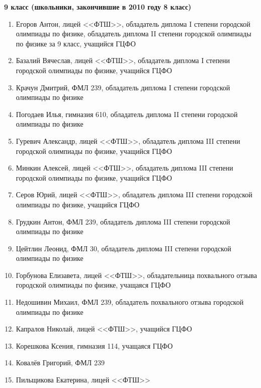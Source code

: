 \textbf{9 класс (школьники, закончившие в 2010 году 8 класс)}
\begin{enumerate}
\item Егоров Антон, лицей <<ФТШ>>, обладатель диплома I степени городской олимпиады по физике, обладатель диплома II степени городской олимпиады по физике за 9 класс, учащийся ГЦФО
\item Базалий Вячеслав, лицей <<ФТШ>>, обладатель диплома I степени городской олимпиады по физике, учащийся ГЦФО
\item Крачун Дмитрий, ФМЛ 239, обладатель диплома I степени городской олимпиады по физике
\item Погодаев Илья, гимназия 610, обладатель диплома II степени городской олимпиады по физике
\item Гуревич Александр, лицей <<ФТШ>>, обладатель диплома III степени городской олимпиады по физике, учащийся ГЦФО
\item Минкин Алексей, лицей <<ФТШ>>, обладатель диплома III степени городской олимпиады по физике, учащийся ГЦФО
\item Серов Юрий, лицей <<ФТШ>>, обладатель диплома III степени городской олимпиады по физике, учащийся ГЦФО
\item Грудкин Антон, ФМЛ 239, обладатель диплома III степени городской олимпиады по физике
\item Цейтлин Леонид, ФМЛ 30, обладатель диплома III степени городской олимпиады по физике
\item Горбунова Елизавета, лицей <<ФТШ>>, обладательница похвального отзыва городской олимпиады по физике, учащаяся ГЦФО
\item Недошивин Михаил, ФМЛ 239, обладатель похвального отзыва городской олимпиады по физике
\item Капралов Николай, лицей <<ФТШ>>, учащийся ГЦФО
\item Корешкова Ксения, гимназия 114, учащаяся ГЦФО
\item Ковалёв Григорий, ФМЛ 239
\item Пильщикова Екатерина, лицей <<ФТШ>>
\end{enumerate}
